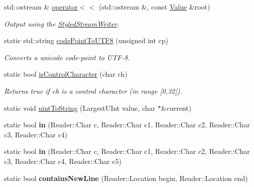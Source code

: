 \begin{DoxyCompactItemize}
\item 
std\-::ostream \& \hyperlink{namespace_json_a87bc83d7e90fc666d28aa16727deda2f}{operator$<$$<$} (std\-::ostream \&, const \hyperlink{class_json_1_1_value}{Value} \&root)
\begin{DoxyCompactList}\small\item\em Output using the \hyperlink{class_json_1_1_styled_stream_writer}{Styled\-Stream\-Writer}. \end{DoxyCompactList}\item 
\hypertarget{namespace_json_adf0456e397a18cd7218a7b51dfc13c73}{static std\-::string \hyperlink{namespace_json_adf0456e397a18cd7218a7b51dfc13c73}{code\-Point\-To\-U\-T\-F8} (unsigned int cp)}\label{namespace_json_adf0456e397a18cd7218a7b51dfc13c73}

\begin{DoxyCompactList}\small\item\em Converts a unicode code-\/point to U\-T\-F-\/8. \end{DoxyCompactList}\item 
\hypertarget{namespace_json_a0381e631737f51331065a388f4f59197}{static bool \hyperlink{namespace_json_a0381e631737f51331065a388f4f59197}{is\-Control\-Character} (char ch)}\label{namespace_json_a0381e631737f51331065a388f4f59197}

\begin{DoxyCompactList}\small\item\em Returns true if ch is a control character (in range \mbox{[}0,32\mbox{[}). \end{DoxyCompactList}\item 
static void \hyperlink{namespace_json_ac1ffd21a9e55122014353c773ccc496e}{uint\-To\-String} (Largest\-U\-Int value, char $\ast$\&current)
\item 
\hypertarget{namespace_json_a7378f09d8f10ef3ccbb2aeefe7ff41d3}{static bool {\bfseries in} (Reader\-::\-Char c, Reader\-::\-Char c1, Reader\-::\-Char c2, Reader\-::\-Char c3, Reader\-::\-Char c4)}\label{namespace_json_a7378f09d8f10ef3ccbb2aeefe7ff41d3}

\item 
\hypertarget{namespace_json_af3dfd6ed13183fdcfaab3ca57b42d3e7}{static bool {\bfseries in} (Reader\-::\-Char c, Reader\-::\-Char c1, Reader\-::\-Char c2, Reader\-::\-Char c3, Reader\-::\-Char c4, Reader\-::\-Char c5)}\label{namespace_json_af3dfd6ed13183fdcfaab3ca57b42d3e7}

\item 
\hypertarget{namespace_json_a4d6ab0f651348832e5cc49b577a854d2}{static bool {\bfseries contains\-New\-Line} (Reader\-::\-Location begin, Reader\-::\-Location end)}\label{namespace_json_a4d6ab0f651348832e5cc49b577a854d2}


\end{DoxyCompactItemize}
